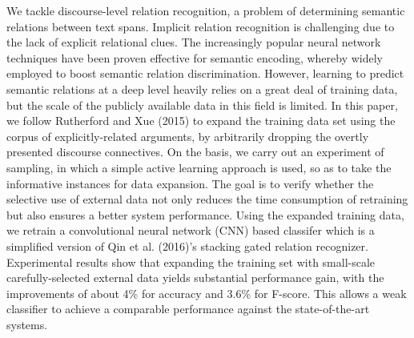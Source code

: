 We tackle discourse-level relation recognition, a problem of determining semantic relations between text spans. Implicit relation recognition is challenging due to the lack of explicit relational clues. The increasingly popular neural network techniques have been proven effective for semantic encoding, whereby widely employed to boost semantic relation discrimination. However, learning to predict semantic relations at a deep level heavily relies on a great deal of training data, but the scale of the publicly available data in this field is limited. In this paper, we follow Rutherford and Xue (2015) to expand the training data set using the corpus of explicitly-related arguments, by arbitrarily dropping the overtly presented discourse connectives. On the basis, we carry out an experiment of sampling, in which a simple active learning approach is used, so as to take the informative instances for data expansion. The goal is to verify whether the selective use of external data not only reduces the time consumption of retraining but also ensures a better system performance. Using the expanded training data, we retrain a convolutional neural network (CNN) based classifer which is a simplified version of Qin et al. (2016)'s stacking gated relation recognizer. Experimental results show that expanding the training set with small-scale carefully-selected external data yields substantial performance gain, with the improvements of about 4\% for accuracy and 3.6\% for F-score. This allows a weak classifier to achieve a comparable performance against the state-of-the-art systems.
